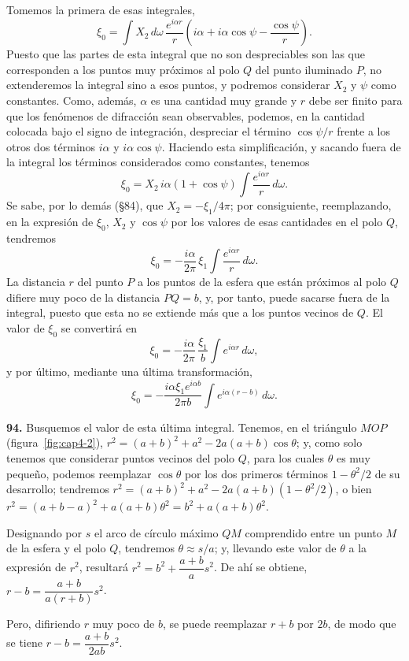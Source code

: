Tomemos la primera de esas integrales,
\[
\xi_0 = \int X_2\,d\omega\,\frac{e^{i\alpha r}}{r}
\left(i\alpha+i\alpha\cos\psi-\frac{\cos\psi}{r}\right).
\]
Puesto que las partes de esta integral que no son despreciables son las
que corresponden a los puntos muy próximos al polo $Q$ del punto iluminado
$P$, no extenderemos la integral sino a esos puntos, y podremos considerar
$X_2$ y $\psi$ como constantes. Como, además, $\alpha$ es una cantidad muy
grande y $r$ debe ser finito para que los fenómenos de difracción sean
observables, podemos, en la cantidad colocada bajo el signo de
integración, despreciar el término $\cos\psi/r$ frente a los otros dos
términos $i\alpha$ y $i\alpha\cos\psi$. Haciendo esta simplificación, y
sacando fuera de la integral los términos considerados como constantes,
tenemos
\[
\xi_0 = X_2\,i\alpha(1+\cos\psi)\int \frac{e^{i\alpha r}}{r}\,d\omega.
\]
Se sabe, por lo demás (§84), que $X_2=-\xi_1/4\pi$; por consiguiente,
reemplazando, en la expresión de $\xi_0$, $X_2$ y $\cos\psi$ por los
valores de esas cantidades en el polo $Q$, tendremos
\[
\xi_0 = -\frac{i\alpha}{2\pi}\,\xi_1 \int \frac{e^{i\alpha r}}{r}\,d\omega.
\]
La distancia $r$ del punto $P$ a los puntos de la esfera que están
próximos al polo $Q$ difiere muy poco de la distancia $PQ=b$, y, por
tanto, puede sacarse fuera de la integral, puesto que esta no se extiende
más que a los puntos vecinos de $Q$. El valor de $\xi_0$ se convertirá en
\[
\xi_0 = -\frac{i\alpha}{2\pi}\,\frac{\xi_1}{b}\int e^{i\alpha r}\,d\omega,
\]
y por último, mediante una última transformación,
\[
\xi_0 = -\frac{i\alpha\xi_1e^{i\alpha b}}{2\pi b}
\int e^{i\alpha(r-b)}\,d\omega.
\]

\noindent\textbf{94.} Busquemos el valor de esta última integral. Tenemos,
en el triángulo $MOP$ (figura~\ref{fig:cap4-2}),
$r^2=(a+b)^2+a^2-2a(a+b)\cos\theta$; y, como solo tenemos que considerar
puntos vecinos del polo $Q$, para los cuales $\theta$ es muy pequeño,
podemos reemplazar $\cos\theta$ por los dos primeros términos
$1-\theta^2/2$ de su desarrollo; tendremos
$r^2=(a+b)^2+a^2-2a(a+b)(1-\theta^2/2)$, o bien
$r^2=(a+b-a)^2+a(a+b)\theta^2=b^2+a(a+b)\theta^2$.

Designando por $s$ el arco de círculo máximo $QM$ comprendido entre un
punto $M$ de la esfera y el polo $Q$, tendremos $\theta\approx s/a$; y,
llevando este valor de $\theta$ a la expresión de $r^2$, resultará
$r^2=b^2+\dfrac{a+b}{a}s^2$. De ahí se obtiene,
$r-b=\dfrac{a+b}{a(r+b)}s^2$.

Pero, difiriendo $r$ muy poco de $b$, se puede reemplazar $r+b$ por $2b$,
de modo que se tiene $r-b=\dfrac{a+b}{2ab}s^2$.


